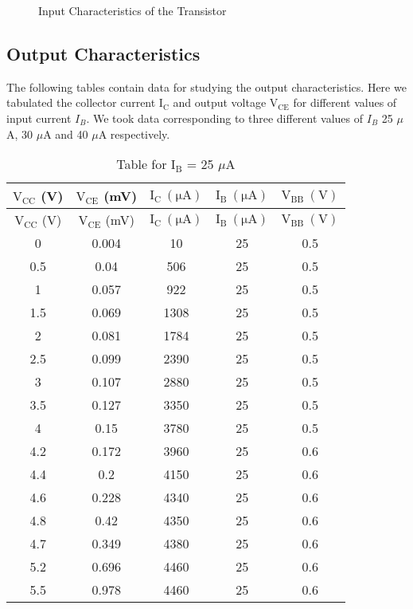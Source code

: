 \documentclass[12pt]{article}
\begin{document}
\begin{figure}[H]
    \centering
    
    \caption{Input Characteristics of the Transistor}
\end{figure}

\subsection{Output Characteristics}
The following tables contain data for studying the output characteristics. Here we tabulated the collector current $\mathrm{I_C}$ and output voltage $\mathrm{V_{CE}}$ for different values of input current $I_B$. We took data corresponding to three different values of $I_B$ 25 $\mu$A, 30 $\mu$A and 40 $\mu$A respectively.

\begin{longtable}[H]{|c|c|c|c|c|}
    \caption{Table for \( \mathrm{I_B}\) = 25 \( \mu \)A }
    \endfirsthead
    \hline   
    $\mathrm{V_{CC}}$ (V) & $\mathrm{V_{CE}}$ (mV) & $\mathrm{I_C \ (\mu A)}$ & $\mathrm{I_B \ (\mu A)}$ & $\mathrm{V_{BB} \ (V)}$ \\ \hline \hline
    \endhead 
    \hline   
    $\mathrm{V_{CC}}$ (V) & $\mathrm{V_{CE}}$ (mV) & $\mathrm{I_C \ (\mu A)}$ & $\mathrm{I_B \ (\mu A)}$ & $\mathrm{V_{BB} \ (V)}$ \\ \hline \hline
       0 & 0.004 & 10 & 25 & 0.5 \\ \hline
       0.5 & 0.04 & 506 & 25 & 0.5 \\ \hline
       1 & 0.057 & 922 & 25 & 0.5 \\ \hline
       1.5 & 0.069 & 1308 & 25 & 0.5 \\ \hline
       2 & 0.081 & 1784 & 25 & 0.5 \\ \hline
       2.5 & 0.099 & 2390 & 25 & 0.5 \\ \hline
       3 & 0.107 & 2880 & 25 & 0.5 \\ \hline
       3.5 & 0.127 & 3350 & 25 & 0.5 \\ \hline
       4 & 0.15 & 3780 & 25 & 0.5 \\ \hline
       4.2 & 0.172 & 3960 & 25 & 0.6 \\ \hline
       4.4 & 0.2 & 4150 & 25 & 0.6 \\ \hline
       4.6 & 0.228 & 4340 & 25 & 0.6 \\ \hline
       4.8 & 0.42 & 4350 & 25 & 0.6 \\ \hline
       4.7 & 0.349 & 4380 & 25 & 0.6 \\ \hline
       5.2 & 0.696 & 4460 &	25 & 0.6 \\ \hline
       5.5 & 0.978 & 4460 &	25 & 0.6 \\ \hline
\end{longtable}
\end{document}
